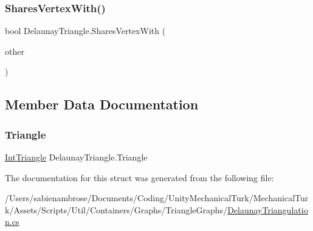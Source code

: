 \subsubsection{\texorpdfstring{Shares\+Vertex\+With()}{SharesVertexWith()}}
{\footnotesize\ttfamily bool Delaunay\+Triangle.\+Shares\+Vertex\+With (\begin{DoxyParamCaption}\item[{\mbox{\hyperlink{struct_delaunay_triangle}{Delaunay\+Triangle}}}]{other }\end{DoxyParamCaption})}



\subsection{Member Data Documentation}
\mbox{\label{struct_delaunay_triangle_ade0daceebe739c61341e33e5dddb2efc}} 
\subsubsection{\texorpdfstring{Triangle}{Triangle}}
{\footnotesize\ttfamily \mbox{\hyperlink{struct_int_triangle}{Int\+Triangle}} Delaunay\+Triangle.\+Triangle}



The documentation for this struct was generated from the following file\+:\begin{DoxyCompactItemize}
\item 
/\+Users/sabienambrose/\+Documents/\+Coding/\+Unity\+Mechanical\+Turk/\+Mechanical\+Turk/\+Assets/\+Scripts/\+Util/\+Containers/\+Graphs/\+Triangle\+Graphs/\mbox{\hyperlink{_delaunay_triangulation_8cs}{Delaunay\+Triangulation.\+cs}}\end{DoxyCompactItemize}
